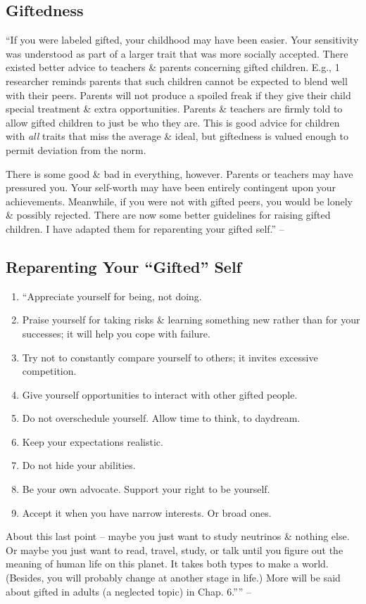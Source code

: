 \documentclass{article}
\numberwithin{equation}{section}
\begin{document}
\subsection{Giftedness}
``If you were labeled gifted, your childhood may have been easier. Your sensitivity was understood as part of a larger trait that was more socially accepted. There existed better advice to teachers \& parents concerning gifted children. E.g., 1 researcher reminds parents that such children cannot be expected to blend well with their peers. Parents will not produce a spoiled freak if they give their child special treatment \& extra opportunities. Parents \& teachers are firmly told to allow gifted children to just be who they are. This is good advice for children with \textit{all} traits that miss the average \& ideal, but giftedness is valued enough to permit deviation from the norm.

There is some good \& bad in everything, however. Parents or teachers may have pressured you. Your self-worth may have been entirely contingent upon your achievements. Meanwhile, if you were not with gifted peers, you would be lonely \& possibly rejected. There are now some better guidelines for raising gifted children. I have adapted them for reparenting your gifted self.'' -- \cite[p. 115]{Aron2013}

\subsection{Reparenting Your ``Gifted'' Self}

\begin{enumerate}
	\item ``Appreciate yourself for being, not doing.
	\item Praise yourself for taking risks \& learning something new rather than for your successes; it will help you cope with failure.
	\item Try not to constantly compare yourself to others; it invites excessive competition.
	\item Give yourself opportunities to interact with other gifted people.
	\item Do not overschedule yourself. Allow time to think, to daydream.
	\item Keep your expectations realistic.
	\item Do not hide your abilities.
	\item Be your own advocate. Support your right to be yourself.
	\item Accept it when you have narrow interests. Or broad ones.
\end{enumerate}
About this last point -- maybe you just want to study neutrinos \& nothing else. Or maybe you just want to read, travel, study, or talk until you figure out the meaning of human life on this planet. It takes both types to make a world. (Besides, you will probably change at another stage in life.) More will be said about gifted in adults (a neglected topic) in Chap. 6.'''' -- \cite[pp. 115--116]{Aron2013}
\end{document}

